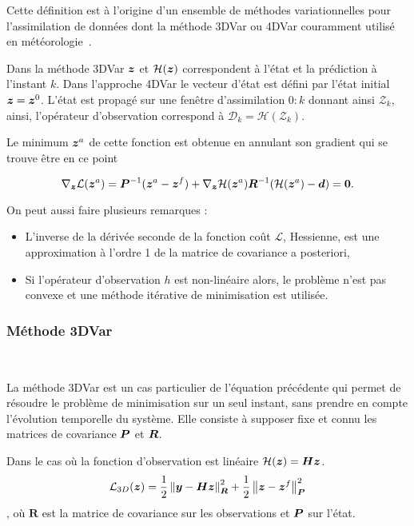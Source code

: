 Cette définition est à l'origine d'un ensemble de méthodes variationnelles pour l'assimilation de données dont la méthode 3DVar ou 4DVar couramment utilisé en météorologie~\cite{talagrand1997assimilation}.

Dans la méthode 3DVar $\bm z$ et $\mathcal H(\bm z)$ correspondent à l'état et la prédiction à l'instant $k$. Dans l'approche 4DVar le vecteur d'état est défini par l'état initial $\bm z = \bm z^0$. L'état est propagé sur une fenêtre d'assimilation $0:k$ donnant ainsi $\mathcal{Z}_k$, ainsi, l'opérateur d'observation correspond à $\mathcal D_k = \mathcal H(\mathcal{Z}_k)$.

Le minimum $\bm z^a$ de cette fonction est obtenue en annulant son gradient qui se trouve être en ce point

\begin{equation*}
    \nabla_{\bm z} \mathcal L(\bm z^a) = \bm{P}^{-1} (\bm z^a - \bm z^f) + \nabla_{\bm z} \mathcal H (\bm z^a) \bm{R}^{-1}(\mathcal H(\bm z^a) - \bm d) = \bm 0.
\end{equation*}

On peut aussi faire plusieurs remarques :

\begin{itemize}
    \item L'inverse de la dérivée seconde de la fonction coût $\mathcal L$, Hessienne, est une approximation à l'ordre 1 de la matrice de covariance a posteriori,
    \item Si l'opérateur d'observation $h$ est non-linéaire alors, le problème n'est pas convexe et une méthode itérative de minimisation est utilisée.
\end{itemize}

\subsubsection{Méthode 3DVar}~\label{subsec:3dvar}

La méthode 3DVar est un cas particulier de l'équation précédente qui permet de résoudre le problème de minimisation sur un seul instant, sans prendre en compte l'évolution temporelle du système. Elle consiste à supposer fixe et connu les matrices de covariance $\bm{P}$ et $\bm{R}$.

Dans le cas où la fonction d'observation est linéaire $\mathcal H(\bm z) = \bm{H} \bm z$.
\begin{equation*}
    \mathcal L_{3D}(\bm z) = \frac{1}{2}\left\lVert \bm{y}-\bm{H} \bm z \right\rVert^2_{\bm R} + \frac{1}{2}\left\lVert \bm z-\bm z^f \right\rVert_{\bm{P}}^2
\end{equation*}, où $\bm R$ est la matrice de covariance sur les observations et $\bm{P}$ sur l'état.


